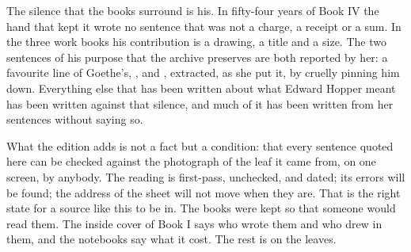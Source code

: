 The silence that the books surround is his. In fifty-four years of Book IV the hand that kept it wrote no sentence that was not a charge, a receipt or a sum. In the three work books his contribution is a drawing, a title and a size. The two sentences of his purpose that the archive preserves are both reported by her: a favourite line of Goethe's, , and , extracted, as she put it, by cruelly pinning him down. Everything else that has been written about what Edward Hopper meant has been written against that silence, and much of it has been written from her sentences without saying so.

\enlargethispage{2\baselineskip}What the edition adds is not a fact but a condition: that every sentence quoted here can be checked against the photograph of the leaf it came from, on one screen, by anybody. The reading is first-pass, unchecked, and dated; its errors will be found; the address of the sheet will not move when they are. That is the right state for a source like this to be in. The books were kept so that someone would read them. The inside cover of Book I says who wrote them and who drew in them, and the notebooks say what it cost. The rest is on the leaves.
